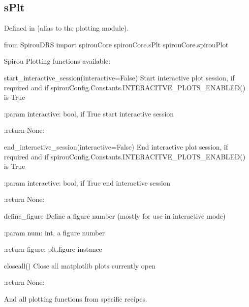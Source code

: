 \noindent\begin{minipage}{\textwidth}
\subsection{sPlt}

Defined in \spirouCore{} (alias to the plotting module).

\begin{pythonbox}
from SpirouDRS import spirouCore
spirouCore.sPlt
spirouCore.spirouPlot
\end{pythonbox}

\begin{pythondocstring}
Spirou Plotting functions available:

start_interactive_session(interactive=False)
    Start interactive plot session, if required and if
    spirouConfig.Constants.INTERACITVE_PLOTS_ENABLED() is True

    :param interactive: bool, if True start interactive session

    :return None:

end_interactive_session(interactive=False)
    End interactive plot session, if required and if
    spirouConfig.Constants.INTERACITVE_PLOTS_ENABLED() is True

    :param interactive: bool, if True end interactive session

    :return None:


define_figure
    Define a figure number (mostly for use in interactive mode)

    :param num: int, a figure number

    :return figure: plt.figure instance

closeall()
    Close all matplotlib plots currently open

    :return None:

And all plotting functions from specific recipes.
\end{pythondocstring}
\end{minipage}

